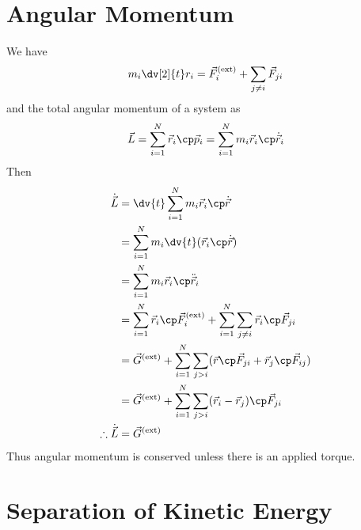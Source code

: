 \section{Angular Momentum}
\label{sec:angular-momentum}

We have 
\[ m_i \dv[2]{t} r_i = \vec{F}_i^{\rm (ext)} + \sum_{j \neq i} \vec{F}_{ji} \]
and the total angular momentum of a system as
\begin{equation}
  \label{eq:10}
  \vec{L} = \sum^N_{i=1} \vec{r}_i \cp \vec{p}_i = \sum_{i=1}^N m_i \vec{r}_i \cp \dot{\vec{r}}_i
\end{equation}
Then
\begin{align}
  \dot{\vec{L}}          & = \dv{t} \sum_{i=1}^N m_i \vec{r}_i \cp \dot{\vec{r}} \nonumber                                                        \\
                         & = \sum_{i=1}^N m_i \dv{t} (\vec{r}_i \cp \dot{\vec{r}} )\nonumber                                                      \\
                         & = \sum_{i=1}^N m_i \vec{r}_i \cp \ddot{\vec{r}}_i \nonumber                                                            \\
                         & = \sum_{i=1}^N \vec{r}_i \cp \vec{F}_i^{\rm (ext)} + \sum_{i=1}^N \sum_{j \neq i} \vec{r}_i \cp \vec{F}_{ji} \nonumber \\
                         & = \vec{G}^{\rm (ext)} + \sum_{i=1}^N \sum_{j>i} (\vec{r} \cp \vec{F}_{ji} + \vec{r}_j \cp \vec{F}_{ij} ) \nonumber     \\
                         & = \vec{G}^{\rm (ext)} + \sum_{i=1}^N \sum_{j>i} (\vec{r}_i - \vec{r}_j) \cp \vec{F}_{ji} \nonumber                      \\
\therefore \dot{\vec{L}} & = \vec{G}^{\rm (ext)}
\end{align}
Thus angular momentum is conserved unless there is an applied torque.

\section{Separation of Kinetic Energy}
\label{sec:separ-kinet-energy}

